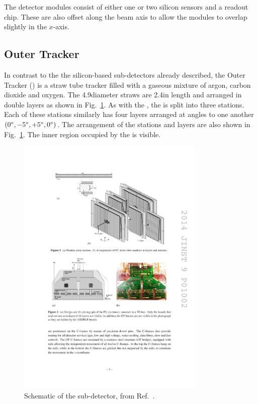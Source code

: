 The detector modules consist of either one or two silicon sensors and a readout chip. These are also offset along the beam axis to allow the modules to overlap slightly in the $x$-axis.



\subsection{Outer Tracker}

In contrast to the the silicon-based sub-detectors already described, the Outer Tracker (\ot) is a straw tube tracker filled with a gaseous mixture of argon, carbon dioxide and oxygen. The 4.9\mm diameter straws are 2.4\m in length and arranged in double layers as shown in Fig.~\ref{fig:Dec_ot_schematic}. As with the \intr, the \ot is split into three stations. Each of these stations similarly has four layers arranged at angles to one another $(0^{\circ},-5^{\circ},+5^{\circ},0^{\circ})$. The arrangement of the stations and layers are also shown in Fig.~\ref{fig:Dec_ot_schematic}. The inner region occupied by the \intr is visible.
 
\begin{figure}[!h]
    \centering
    \includegraphics[width=0.8\textwidth]{figs/Detector/ot_layout.pdf}
    \caption{Schematic of the \ot sub-detector, from Ref.~\cite{LHCb-DP-2013-003}.}
    \label{fig:Dec_ot_schematic}   
\end{figure}



